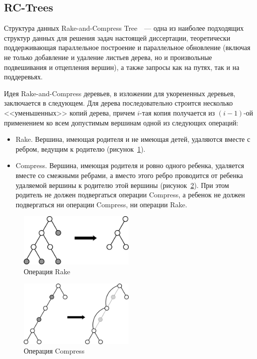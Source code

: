 \documentclass[specification,annotation,times]{itmo-student-thesis}
\begin{document}
\subsection{RC-Trees}

Структура данных Rake-and-Compress Tree~\cite{reif94}~--- одна из наиболее подходящих структур данных для решения задач настоящей диссертации,
теоретически поддерживающая параллельное построение и параллельное обновление (включая не только добавление и удаление листьев дерева, но и произвольные
подвешивания и отцепления вершин), а также запросы как на путях, так и на поддеревьях.

Идея Rake-and-Compress деревьев, в изложении для укорененных деревьев, заключается в следующем. Для дерева последовательно строится несколько <<уменьшенных>> копий дерева, причем $i$-тая копия получается
из $(i-1)$-ой применением ко всем допустимым вершинам одной из следующих операций:
\begin{itemize}
    \item Rake. Вершина, имеющая родителя и не имеющая детей, удаляются вместе с ребром, ведущим к родителю (рисунок~\ref{fig:rake}).
    \item Compress. Вершина, имеющая родителя и ровно одного ребенка, удаляется вместе со смежными ребрами, а вместо этого ребро проводится от ребенка удаляемой вершины к родителю этой вершины
          (рисунок~\ref{fig:compress}). При этом родитель не должен подвергаться операции Compress, а ребенок не должен подвергаться ни операции Compress, ни операции Rake.
\end{itemize}

\begin{figure}[!ht]
\centering
\includegraphics[width=0.5\textwidth]{pic/rake.png}
\caption{Операция Rake}\label{fig:rake}
\end{figure}
\begin{figure}[!ht]
\centering
\includegraphics[width=0.5\textwidth]{pic/compress.png}
\caption{Операция Compress}\label{fig:compress}
\end{figure}
\end{document}
